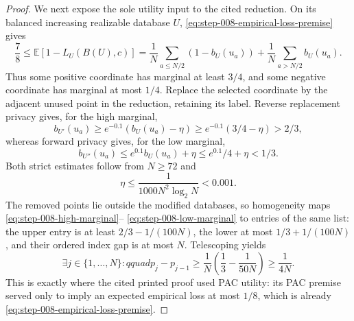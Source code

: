 \begin{proof}
We next expose the sole utility input to the cited reduction.  On its
balanced increasing realizable database \(U\),
\eqref{eq:step-008-empirical-loss-premise} gives
\begin{equation}\label{eq:step-008-balanced-accuracy}
\frac78
\le\mathbb E[1-L_U(B(U),c)]
=\frac1N\sum_{a\le N/2}(1-b_U(u_a))
 +\frac1N\sum_{a>N/2}b_U(u_a).
\end{equation}
Thus some positive coordinate has marginal at least \(3/4\), and some
negative coordinate has marginal at most \(1/4\).  Replace the selected
coordinate by the adjacent unused point in the reduction, retaining its
label.  Reverse replacement privacy gives, for the high marginal,
\begin{equation}\label{eq:step-008-high-marginal}
b_{U'}(u_a)
\ge e^{-0.1}(b_U(u_a)-\eta)
\ge e^{-0.1}(3/4-\eta)>2/3,
\end{equation}
whereas forward privacy gives, for the low marginal,
\begin{equation}\label{eq:step-008-low-marginal}
b_{U''}(u_a)
\le e^{0.1}b_U(u_a)+\eta
\le e^{0.1}/4+\eta<1/3.
\end{equation}
Both strict estimates follow from \(N\ge72\) and
\begin{equation}\label{eq:step-008-small-eta}
\eta\le\frac1{1000N^2\log_2N}<0.001.
\end{equation}
The removed points lie outside the modified databases, so homogeneity maps
\eqref{eq:step-008-high-marginal}--
\eqref{eq:step-008-low-marginal} to entries of the same list: the upper
entry is at least \(2/3-1/(100N)\), the lower at most
\(1/3+1/(100N)\), and their ordered index gap is at most \(N\).
Telescoping yields
\begin{equation}\label{eq:step-008-probability-jump}
\exists j\in\{1,\ldots,N\}:qquad
p_j-p_{j-1}\ge
\frac1N\left(\frac13-\frac1{50N}\right)
\ge\frac1{4N}.
\end{equation}
This is exactly where the cited printed proof used PAC utility: its PAC
premise served only to imply an expected empirical loss at most \(1/8\),
which is already \eqref{eq:step-008-empirical-loss-premise}.


\end{proof}
